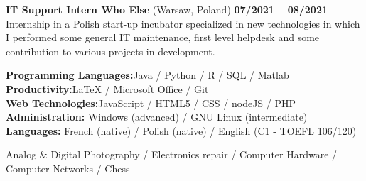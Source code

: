 \documentclass[11pt]{report}
\begin{document}
\noindent\textbf{IT Support Intern \textbar\space Who Else} (Warsaw, Poland)
\hfill
\textbf{07/2021 – 08/2021} \\
Internship in a Polish start-up incubator specialized in new technologies in which I performed some general IT maintenance, first level helpdesk and some contribution to various projects in development.

	\begin{flushleft}
	 \hrulefill
	\end{flushleft}



  \noindent\textbf{Programming Languages:}\hfill{Java / Python / R / SQL / Matlab} \\
  \textbf{Productivity:}\hfill LaTeX / Microsoft Office / Git\\
  \textbf{Web Technologies:}\hfill JavaScript / HTML5 / CSS / nodeJS / PHP  \\
  \textbf{Administration:} \hfill Windows (advanced) / GNU Linux (intermediate)\\
  \textbf{Languages:} \hfill French (native) / Polish (native) / English (C1 - TOEFL 106/120) 

	\begin{flushleft}
	 \hrulefill
	\end{flushleft}

\noindent Analog \& Digital Photography / Electronics repair / Computer Hardware / Computer Networks  / Chess
\end{document}
